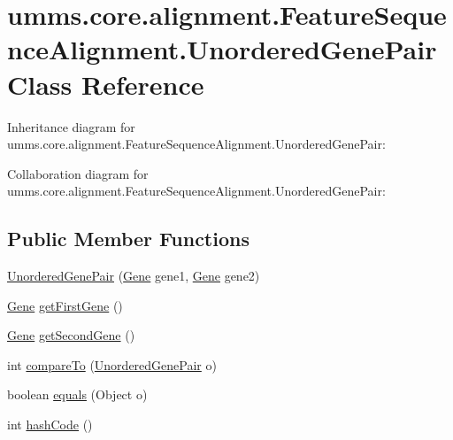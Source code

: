 \hypertarget{classumms_1_1core_1_1alignment_1_1_feature_sequence_alignment_1_1_unordered_gene_pair}{\section{umms.\+core.\+alignment.\+Feature\+Sequence\+Alignment.\+Unordered\+Gene\+Pair Class Reference}
\label{classumms_1_1core_1_1alignment_1_1_feature_sequence_alignment_1_1_unordered_gene_pair}
}


Inheritance diagram for umms.\+core.\+alignment.\+Feature\+Sequence\+Alignment.\+Unordered\+Gene\+Pair\+:


Collaboration diagram for umms.\+core.\+alignment.\+Feature\+Sequence\+Alignment.\+Unordered\+Gene\+Pair\+:
\subsection*{Public Member Functions}
\begin{DoxyCompactItemize}
\item 
\hyperlink{classumms_1_1core_1_1alignment_1_1_feature_sequence_alignment_1_1_unordered_gene_pair_a0b2afb36630c6ab7e4357fd451970ece}{Unordered\+Gene\+Pair} (\hyperlink{classumms_1_1core_1_1annotation_1_1_gene}{Gene} gene1, \hyperlink{classumms_1_1core_1_1annotation_1_1_gene}{Gene} gene2)
\item 
\hyperlink{classumms_1_1core_1_1annotation_1_1_gene}{Gene} \hyperlink{classumms_1_1core_1_1alignment_1_1_feature_sequence_alignment_1_1_unordered_gene_pair_af4f9363590209bb087cba52a12d8a23a}{get\+First\+Gene} ()
\item 
\hyperlink{classumms_1_1core_1_1annotation_1_1_gene}{Gene} \hyperlink{classumms_1_1core_1_1alignment_1_1_feature_sequence_alignment_1_1_unordered_gene_pair_a3ded680df55f81b0e2060155291bb872}{get\+Second\+Gene} ()
\item 
int \hyperlink{classumms_1_1core_1_1alignment_1_1_feature_sequence_alignment_1_1_unordered_gene_pair_a2bf54d6e4db59e3149e03893df7d2644}{compare\+To} (\hyperlink{classumms_1_1core_1_1alignment_1_1_feature_sequence_alignment_1_1_unordered_gene_pair}{Unordered\+Gene\+Pair} o)
\item 
boolean \hyperlink{classumms_1_1core_1_1alignment_1_1_feature_sequence_alignment_1_1_unordered_gene_pair_ae6caf83e8cefa8e19d65606baf5c41b1}{equals} (Object o)
\item 
int \hyperlink{classumms_1_1core_1_1alignment_1_1_feature_sequence_alignment_1_1_unordered_gene_pair_ad34f1fa5f0c1efb380e36fdc6463f7a6}{hash\+Code} ()
\end{DoxyCompactItemize}


